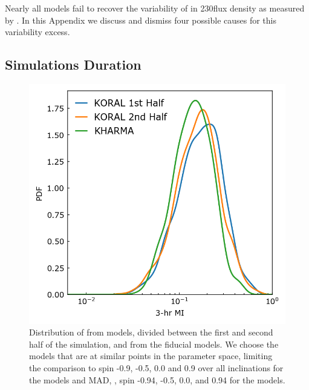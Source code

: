 
Nearly all models fail to recover the variability of \sgra in 230\GHz flux density as measured by .
In this Appendix we discuss and dismiss four possible causes for this variability excess.

\subsection{Simulations Duration}\label{app:narayan}

\begin{figure}
  \centering
  \includegraphics[width=\columnwidth]{./figures/Koral_vs_IL_MI.png}
  \caption{Distribution of  from \koral models, divided between the first and second half of the simulation, and from the fiducial \kharma models. We choose the models that are at similar points in the parameter space, limiting the comparison to spin -0.9, -0.5, 0.0 and 0.9 over all inclinations for the \koral models and MAD, , spin -0.94, -0.5, 0.0, and 0.94 for the \kharma models.} 
  \label{fig:koral_MI}
\end{figure}


